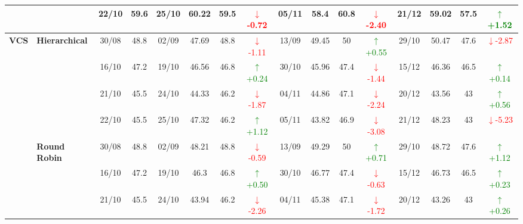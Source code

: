 {\begin{longtable}{llcc|cccc|cccc|cccc}
&
& 22/10 & 59.6 & 25/10 & 60.22 & 59.5 & \textcolor{red}{\(\downarrow\)-0.72} & 05/11 & 58.4 & 60.8 & \textcolor{red}{\(\downarrow\)-2.40} & 21/12 & 59.02 & 57.5 & \textcolor{green}{\(\uparrow\)+1.52} \\
\midrule



\multirow{12}{*}{\textbf{VCS}} 
& \textbf{Hierarchical}
& 30/08 & 48.8 & 02/09 & 47.69 & 48.8 & \textcolor{red}{\(\downarrow\)-1.11} & 13/09 & 49.45 & 50 & \textcolor{green}{\(\uparrow\)+0.55} & 29/10 & 50.47 & 47.6 & \textcolor{red}{\(\downarrow\)-2.87} \\

&
& 16/10 & 47.2 & 19/10 & 46.56 & 46.8 & \textcolor{green}{\(\uparrow\)+0.24} & 30/10 & 45.96 & 47.4 & \textcolor{red}{\(\downarrow\)-1.44} & 15/12 & 46.36 & 46.5 & \textcolor{green}{\(\uparrow\)+0.14} \\

&
& 21/10 & 45.5 & 24/10 & 44.33 & 46.2 & \textcolor{red}{\(\downarrow\)-1.87} & 04/11 & 44.86 & 47.1 & \textcolor{red}{\(\downarrow\)-2.24} & 20/12 & 43.56 & 43 & \textcolor{green}{\(\uparrow\)+0.56} \\

&
& 22/10 & 45.5 & 25/10 & 47.32 & 46.2 & \textcolor{green}{\(\uparrow\)+1.12} & 05/11 & 43.82 & 46.9 & \textcolor{red}{\(\downarrow\)-3.08} & 21/12 & 48.23 & 43 & \textcolor{red}{\(\downarrow\)-5.23} \\
\cmidrule(lr){2-16}


& \textbf{Round Robin}
& 30/08 & 48.8 & 02/09 & 48.21 & 48.8 & \textcolor{red}{\(\downarrow\)-0.59} & 13/09 & 49.29 & 50 & \textcolor{green}{\(\uparrow\)+0.71} & 29/10 & 48.72 & 47.6 & \textcolor{green}{\(\uparrow\)+1.12} \\

&
& 16/10 & 47.2 & 19/10 & 46.3 & 46.8 & \textcolor{green}{\(\uparrow\)+0.50} & 30/10 & 46.77 & 47.4 & \textcolor{red}{\(\downarrow\)-0.63} & 15/12 & 46.73 & 46.5 & \textcolor{green}{\(\uparrow\)+0.23} \\

&
& 21/10 & 45.5 & 24/10 & 43.94 & 46.2 & \textcolor{red}{\(\downarrow\)-2.26} & 04/11 & 45.38 & 47.1 & \textcolor{red}{\(\downarrow\)-1.72} & 20/12 & 43.26 & 43 & \textcolor{green}{\(\uparrow\)+0.26} \\


\end{longtable}}
